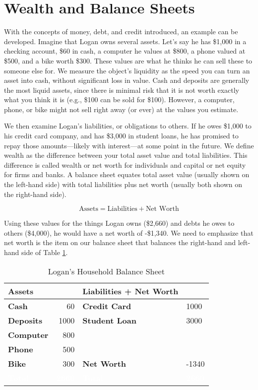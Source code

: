 \documentclass[
]{book}
\begin{document}
\hypertarget{wealth-and-balance-sheets}{%
\section{Wealth and Balance Sheets}\label{wealth-and-balance-sheets}}

With the concepts of money, debt, and credit introduced, an example can be developed. Imagine that Logan owns several assets. Let's say he has \$1,000 in a checking account, \$60 in cash, a computer he values at \$800, a phone valued at \$500, and a bike worth \$300. These values are what he thinks he can sell these to someone else for. We measure the object's liquidity as the speed you can turn an asset into cash, without significant loss in value. Cash and deposits are generally the most liquid assets, since there is minimal risk that it is not worth exactly what you think it is (e.g., \$100 can be sold for \$100). However, a computer, phone, or bike might not sell right away (or ever) at the values you estimate.

We then examine Logan's liabilities, or obligations to others. If he owes \$1,000 to his credit card company, and has \$3,000 in student loans, he has promised to repay those amounts---likely with interest---at some point in the future. We define wealth as the difference between your total asset value and total liabilities. This difference is called wealth or net worth for individuals and capital or net equity for firms and banks. A balance sheet equates total asset value (usually shown on the left-hand side) with total liabilities plus net worth (usually both shown on the right-hand side).

\[ \text{Assets}=\text{Liabilities}+\text{Net Worth}\]

Using these values for the things Logan owns (\$2,660) and debts he owes to others (\$4,000), he would have a net worth of -\$1,340. We need to emphasize that net worth is the item on our balance sheet that balances the right-hand and left-hand side of Table \ref{tab:break}.

\begin{table}

\caption{\label{tab:break}Logan’s Household Balance Sheet}
\centering
\begin{tabular}[t]{>{\bfseries}lr|>{\bfseries}ll}
\toprule
Assets &  & Liabilities + Net Worth & \\
\midrule
Cash & 60 & Credit Card & 1000\\
Deposits & 1000 & Student Loan & 3000\\
Computer & 800 &  & \\
Phone & 500 &  & \\
Bike & 300 & Net Worth & -1340\\
\addlinespace
\rowcolor[HTML]{666666}  \textcolor{white}{\textbf{Total}} & \textcolor{white}{\textbf{2660}} & \textcolor{white}{\textbf{Total}} & \textcolor{white}{\textbf{2660}}\\
\bottomrule
\end{tabular}
\end{table}
\end{document}
